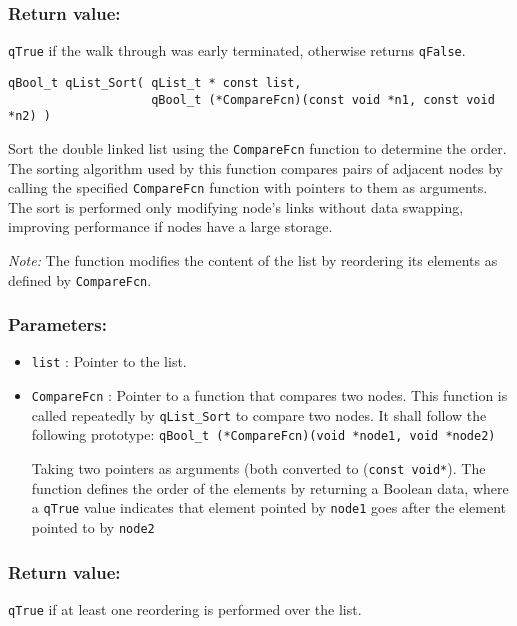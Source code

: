\subsubsection*{Return value:}
\lstinline{qTrue} if the walk through was early terminated, otherwise returns \lstinline{qFalse}.

\noindent\hrulefill

\begin{lstlisting}[style=CStyle]
qBool_t qList_Sort( qList_t * const list, 
                    qBool_t (*CompareFcn)(const void *n1, const void *n2) ) 
\end{lstlisting} 

Sort the double linked list using the \lstinline{CompareFcn} function to 
determine the order.
The sorting algorithm used by this function compares pairs of adjacent nodes by calling the specified \lstinline{CompareFcn} function with pointers to them as arguments. The sort is performed only modifying node's links without data swapping, improving performance if nodes have a large storage.

\textit{Note:} The function modifies the content of the list by reordering its 
elements as defined by \lstinline{CompareFcn}.

\subsubsection*{Parameters:}
\begin{itemize}
    \item \lstinline{list} : Pointer to the list. 
    \item \lstinline{CompareFcn} : Pointer to a function that compares two nodes.
                    This function is called repeatedly by \lstinline{qList_Sort} to compare two nodes. It shall follow the following prototype:
                    \lstinline{qBool_t (*CompareFcn)(void *node1, void *node2)}
                    
                    Taking two pointers as arguments (both converted to (\lstinline{const void*}). The function defines the order of the elements by returning a Boolean data, where a \lstinline{qTrue} value indicates that element pointed by \lstinline{node1} goes after the element pointed to by \lstinline{node2}
\end{itemize}

\subsubsection*{Return value:}
\lstinline{qTrue} if at least one reordering is performed over the list. 


